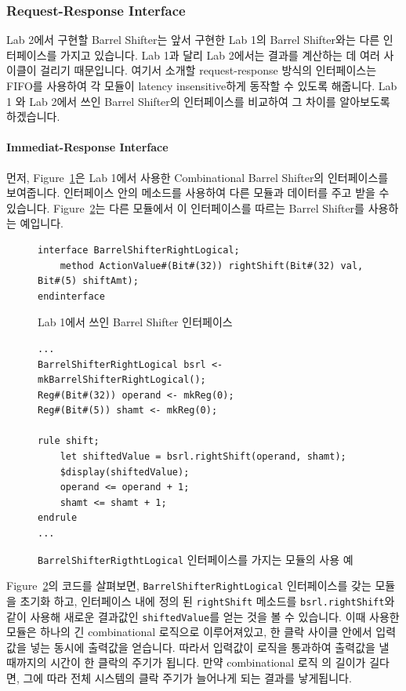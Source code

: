 \documentclass{article}
\begin{document}
\subsubsection{Request-Response Interface}
Lab 2에서 구현할 Barrel Shifter는 앞서 구현한 Lab 1의 Barrel Shifter와는 다른 인터페이스를 가지고 있습니다.
Lab 1과 달리 Lab 2에서는 결과를 계산하는 데 여러 사이클이 걸리기 때문입니다.
여기서 소개할 request-response 방식의 인터페이스는 FIFO를 사용하여
각 모듈이 latency insensitive하게 동작할 수 있도록 해줍니다.
Lab 1 와 Lab 2에서 쓰인 Barrel Shifter의 인터페이스를 비교하여 그 차이를 알아보도록 하겠습니다.

\paragraph{Immediat-Response Interface}
먼저, Figure~\ref{fig:brs_interface}은 Lab 1에서 사용한 Combinational Barrel Shifter의 인터페이스를 보여줍니다. 
인터페이스 안의 메소드를 사용하여 다른 모듈과 데이터를 주고 받을 수 있습니다. 
Figure~\ref{fig:brs_usage}는 다른 모듈에서 이 인터페이스를 따르는 Barrel Shifter를 사용하는 예입니다.

\begin{figure}[!ht]
\centering
\begin{Verbatim}
interface BarrelShifterRightLogical;
	method ActionValue#(Bit#(32)) rightShift(Bit#(32) val, Bit#(5) shiftAmt);
endinterface
\end{Verbatim}
\caption{Lab 1에서 쓰인 Barrel Shifter 인터페이스\label{fig:brs_interface}}
\end{figure}



\begin{figure}[!ht]
	\centering
\begin{Verbatim}
...
BarrelShifterRightLogical bsrl <- mkBarrelShifterRightLogical();
Reg#(Bit#(32)) operand <- mkReg(0);
Reg#(Bit#(5)) shamt <- mkReg(0);

rule shift;
	let shiftedValue = bsrl.rightShift(operand, shamt);
	$display(shiftedValue);
	operand <= operand + 1;
	shamt <= shamt + 1;
endrule
...
\end{Verbatim}
	\caption{\texttt{BarrelShifterRigthtLogical} 인터페이스를 가지는 모듈의 사용 예\label{fig:brs_usage}}
\end{figure}

Figure~\ref{fig:brs_usage}의 코드를 살펴보면, \texttt{BarrelShifterRightLogical} 인터페이스를 갖는 모듈을 
초기화 하고, 인터페이스 내에 정의 된 \texttt{rightShift} 메소드를 \texttt{bsrl.rightShift}와 같이 사용해 새로운 결과값인
\texttt{shiftedValue}를 얻는 것을 볼 수 있습니다. 이때 사용한 모듈은 하나의 긴 combinational 로직으로
이루어져있고, 한 클락 사이클 안에서 입력값을 넣는 동시에 출력값을 얻습니다. 따라서 입력값이
로직을 통과하여 출력값을 낼 때까지의 시간이 한 클락의 주기가 됩니다. 만약 combinational 로직
의 길이가 길다면, 그에 따라 전체 시스템의 클락 주기가 늘어나게 되는 결과를 낳게됩니다.
\end{document}
